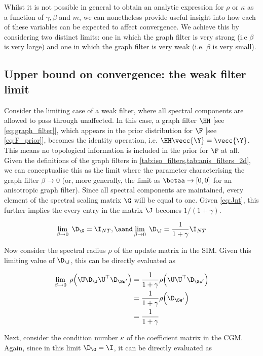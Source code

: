Whilst it is not possible in general to obtain an analytic expression for $\rho$ or $\kappa$ as a function of $\gamma, \beta$ and $m$, we can nonetheless provide useful insight into how each of these variables can be expected to affect convergence. We achieve this by considering two distinct limits: one in which the graph filter is very strong (i.e $\beta$ is very large) and one in which the graph filter is very weak (i.e. $\beta$ is very small). 

\subsection{Upper bound on convergence: the weak filter limit}

Consider the limiting case of a weak filter, where all spectral components are allowed to pass through unaffected. In this case, a graph filter $\HH$ [see \cref{eq:graph_filter}], which appears in the prior distribution for $\F$ [see \cref{eq:F_prior}], becomes the identity operation, i.e. $\HH \vecc{\Y} = \vecc{\Y}$. This means no topological information is included in the prior for $\F$ at all. Given the definitions of the graph filters in \cref{tab:iso_filters,tab:anis_filters_2d}, we can conceptualise this as the limit where the parameter characterising the graph filter $\beta \rightarrow 0$ (or, more generally, the limit as $\betaa \rightarrow [0, 0]$ for an anisotropic graph filter). Since all spectral components are maintained, every element of the spectral scaling matrix $\G$ will be equal to one. Given \cref{eq:Jnt}, this further implies the every entry in the matrix $\J$ becomes $1 / (1 + \gamma)$. 

$$
\lim_{\beta \rightarrow 0} \; \D_\G = \I_{NT}, \aand \lim_{\beta \rightarrow 0} \; \D_\J = \frac{1}{1 + \gamma} \I_{NT}
$$

Now consider the spectral radius $\rho$ of the update matrix in the SIM. Given this limiting value of $\D_\J$, this can be directly evaluated as

\begin{align}
    \lim_{\beta \rightarrow 0} \; \rho\Big(\U \D_\J \U^\top \D_{\Ss'} \Big) &= \frac{1}{1 + \gamma} \rho\Big(\U \U^\top \D_{\Ss'} \Big) \notag \\
    &= \frac{1}{1 + \gamma} \rho\Big(\D_{\Ss'} \Big) \notag \\
    &= \frac{1}{1 + \gamma} \label{eq:beta_lim_0} 
\end{align}

Next, consider the condition number $\kappa$ of the coefficient matrix in the CGM. Again, since in this limit $\D_\G = \I$, it can be directly evaluated as 


